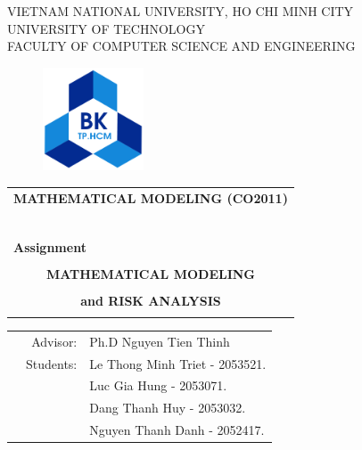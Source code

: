 \documentclass[a4paper]{article}
\begin{document}
\begin{titlepage}
	\begin{center}
		VIETNAM NATIONAL UNIVERSITY, HO CHI MINH CITY \\
		UNIVERSITY OF TECHNOLOGY \\
		FACULTY OF COMPUTER SCIENCE AND ENGINEERING
	\end{center}

	\vspace{1cm}

	\begin{figure}[h!]
		\begin{center}
			\includegraphics[width=3cm]{hcmut.png}
		\end{center}
	\end{figure}

	\vspace{1cm}


	\begin{center}
		\begin{tabular}{c}
			\multicolumn{1}{c}{\textbf{{\Large MATHEMATICAL MODELING (CO2011)}}} \\
			~~                                                                   \\
			\hline
			\\
			\multicolumn{1}{l}{\textbf{{\Large Assignment}}}                     \\
			\\
			\textbf{{\Huge MATHEMATICAL MODELING}}                               \\
			\\
			\textbf{{\Huge and RISK ANALYSIS}}                                   \\
			\\
			\hline
		\end{tabular}
	\end{center}

	\vspace{2cm}

	\begin{table}[h]
		\begin{tabular}{rrl}
			\hspace{5 cm} & Advisor:  & Ph.D Nguyen Tien Thinh         \\
			              & Students: & Le Thong Minh Triet - 2053521. \\
			              &           & Luc Gia Hung - 2053071.        \\
			              &           & Dang Thanh Huy - 2053032.      \\
			              &           & Nguyen Thanh Danh - 2052417.   \\
		\end{tabular}
	\end{table}


\end{titlepage}
\end{document}
